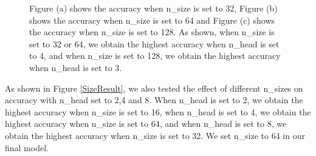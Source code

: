 \documentclass[10pt, conference, compsocconf]{IEEEtran}
\begin{document}
\begin{figure}[h]
{\begin{minipage}{8cm}
	\end{minipage}}
	\caption{Figure (a) shows the accuracy when n\_size is set to 32, Figure (b) shows the accuracy when n\_size is set to 64 and Figure (c) shows the accuracy when n\_size is set to 128. As shown, when n\_size is set to 32 or 64, we obtain the highest accuracy when n\_head is set to 4, and when n\_size is set to 128, we obtain the highest accuracy when n\_head is set to 3.}
	\label{HeadResult}
\end{figure}


As shown in Figure \ref{SizeResult}, we also tested the effect of different n\_sizes on accuracy with n\_head set to 2,4 and 8. When n\_head is set to 2, we obtain the highest accuracy when n\_size is set to 16, when n\_head is set to 4, we obtain the highest accuracy when n\_size is set to 64, and when n\_head is set to 8, we obtain the highest accuracy when n\_size is set to 32. We set n\_size to 64 in our final model.
\end{document}
